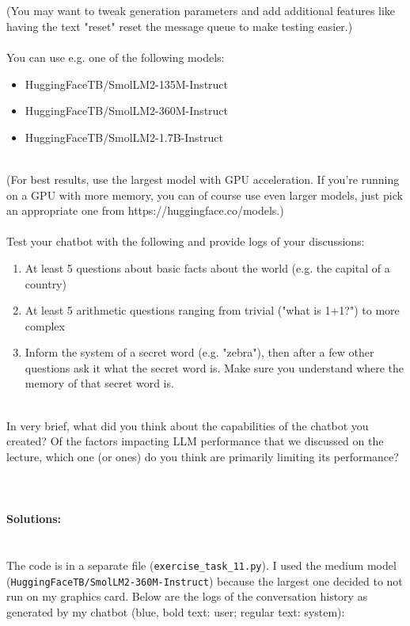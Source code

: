 \documentclass{article}
\begin{document}
\\\\
(You may want to tweak generation parameters and add additional features 
like having the text "reset" reset the message queue to make testing easier.)
\\\\
You can use e.g. one of the following models:
\\
\begin{itemize}
	\item HuggingFaceTB/SmolLM2-135M-Instruct
	\item HuggingFaceTB/SmolLM2-360M-Instruct
	\item HuggingFaceTB/SmolLM2-1.7B-Instruct
\end{itemize}
\\
(For best results, use the largest model with GPU acceleration. If you're 
running on a GPU with more memory, you can of course use even larger 
models, just pick an appropriate one from https://huggingface.co/models.)
\\\\
Test your chatbot with the following and provide logs of your discussions:
\\
\begin{enumerate}
	\item At least 5 questions about basic facts about the world (e.g. the capital of a country)
	\item At least 5 arithmetic questions ranging from trivial ("what is 1+1?") to more complex
	\item Inform the system of a secret word (e.g. "zebra"), then after a few other questions ask it what the secret word is. Make sure you understand where the memory of that secret word is.
\end{enumerate}
\\
In very brief, what did you think about the capabilities of the chatbot you 
created? Of the factors impacting LLM performance that we discussed on the 
lecture, which one (or ones) do you think are primarily limiting its 
performance?
\\\\\\\\

\textbf{Solutions:} \\\\\\
The code is in a separate file (\texttt{exercise\_task\_11.py}). I used the 
medium model (\texttt{HuggingFaceTB/SmolLM2-360M-Instruct}) because the 
largest one decided to not run on my graphics card. Below are the logs of 
the conversation history as generated by my chatbot (blue, bold text: user; 
regular text: system):
\\\\\\\\
\end{document}
